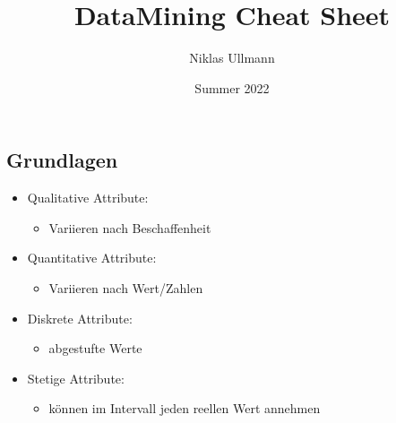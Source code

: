 \documentclass[a4paper]{article}
\title{DataMining Cheat Sheet}
\author{Niklas Ullmann}
\date{Summer 2022}
\begin{document}
\begin{landscape}
    \thispagestyle{empty}

    \begin{multicols}{3}
        
    \section{Grundlagen}
        \begin{itemize}[noitemsep,nolistsep,leftmargin=*]
            \item Qualitative Attribute: 
                \begin{itemize}
                    \item Variieren nach Beschaffenheit
                \end{itemize}
            \item Quantitative Attribute:
                \begin{itemize}
                    \item Variieren nach Wert/Zahlen
                \end{itemize}
        \end{itemize}
        \begin{itemize}[noitemsep,nolistsep,leftmargin=*]
            \item Diskrete Attribute: 
                \begin{itemize}
                    \item abgestufte Werte
                \end{itemize}
            \item Stetige Attribute:
                \begin{itemize}
                    \item können im Intervall jeden reellen Wert annehmen
                \end{itemize}
        \end{itemize}

\end{multicols}
\end{landscape}
\end{document}
